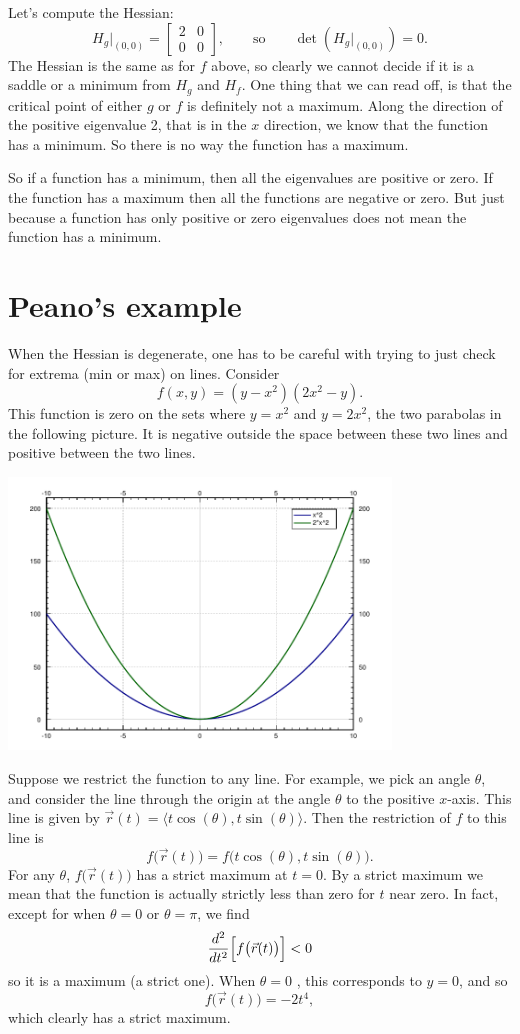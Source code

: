 \documentclass[12pt]{article}
\begin{document}
Let's compute the Hessian:
$$
H_g\big|_{(0,0)} =
\begin{bmatrix}
2 & 0 \\
0 & 0
\end{bmatrix}
,
\qquad \text{so} \qquad
\det(H_g\big|_{(0,0)}) = 0 .
$$
The Hessian is the same as for $f$ above, so clearly we cannot decide
if it is a saddle or a minimum
from $H_g$ and $H_f$.  One thing that we can read off, is that the critical
point of either $g$ or $f$ is definitely not a maximum.
Along the direction of the positive eigenvalue 2, that is in the $x$
direction, we know that the function
has a minimum.  So there is no way the function has a maximum.

So if a function has a minimum, then all the eigenvalues are positive or
zero.  If the function has a maximum then all the functions are negative or
zero.  But just because a function has only positive or zero eigenvalues
does not mean the function has a minimum.

\section{Peano's example}

When the Hessian is degenerate,
one has to be careful with trying to just check for extrema (min or max) on
lines.  Consider
$$
f(x,y) = (y-x^2)(2x^2-y) .
$$
This function is zero on the sets where $y=x^2$ and $y=2x^2$, the two
parabolas in the following picture.  It is negative outside the space
between these two lines and positive between the two lines.
\begin{center}
\includegraphics[width=4.0in]{peanocurves}
\end{center}
Suppose we restrict the function to any line. For example, we pick an angle
$\theta$, and consider the line through the origin at the angle 
$\theta$ to the positive $x$-axis.
This line is given by $\vec{r}(t) = \bigl\langle t \cos(\theta),t
\sin(\theta)\bigr\rangle$.  Then the restriction of $f$ to this line is
$$
f\bigl(\vec{r}(t)\bigr) = f\bigl(t\cos(\theta),t\sin (\theta)\bigr) .
$$
For any $\theta$, $f\bigl(\vec{r}(t)\bigr)$ has a strict maximum at $t=0$.
By a strict maximum we mean that the function is actually
strictly less than zero for $t$ near zero.
In fact, except for when $\theta=0$ or $\theta=\pi$, we find
$$
\frac{d^2}{dt^2} \Bigl[ f \bigl( \vec{r}(t) \bigr) \Bigr] < 0
$$
so it is a maximum (a strict one).  When $\theta = 0$ , this corresponds to
$y=0$, and so
$$
f \bigl( \vec{r}(t) \bigr) = -2t^4 ,
$$
which clearly has a strict maximum.
\end{document}
